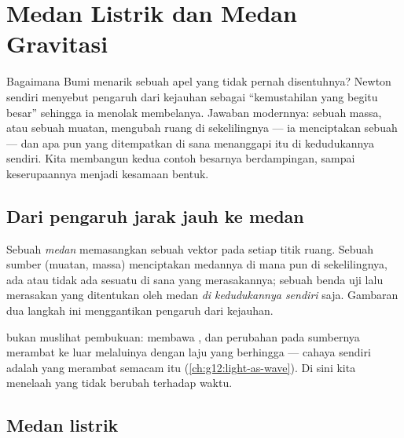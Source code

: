 \chapter{Medan Listrik dan Medan Gravitasi}\label{ch:g11:electric-gravitational-fields}

Bagaimana Bumi menarik sebuah apel yang tidak pernah disentuhnya? Newton
sendiri menyebut pengaruh dari kejauhan sebagai ``kemustahilan yang
begitu besar'' sehingga ia menolak membelanya. Jawaban modernnya: sebuah
massa, atau sebuah muatan, mengubah ruang di sekelilingnya --- ia
menciptakan sebuah \emph{} --- dan apa pun yang ditempatkan di sana
menanggapi  itu di kedudukannya sendiri. Kita membangun kedua
contoh besarnya berdampingan, sampai keserupaannya menjadi kesamaan
bentuk.

\section{Dari pengaruh jarak jauh ke medan}

\begin{definition}[Medan]\label{def:g11:electric-gravitational-fields:field}
Sebuah \emph{medan} memasangkan sebuah vektor pada setiap
titik ruang. Sebuah sumber (muatan, massa) menciptakan medannya di mana
pun di sekelilingnya, ada atau tidak ada sesuatu di sana yang
merasakannya; sebuah benda uji lalu merasakan  yang ditentukan oleh
medan \emph{di kedudukannya sendiri} saja. Gambaran dua langkah ini
menggantikan pengaruh dari kejauhan.
\end{definition}

\begin{remark}
 bukan muslihat pembukuan:  membawa , dan perubahan pada
sumbernya merambat ke luar melaluinya dengan laju yang berhingga ---
cahaya sendiri adalah  yang merambat semacam itu
(\cref{ch:g12:light-as-wave}). Di sini kita menelaah  yang tidak
berubah terhadap waktu.
\end{remark}

\section{Medan listrik}

